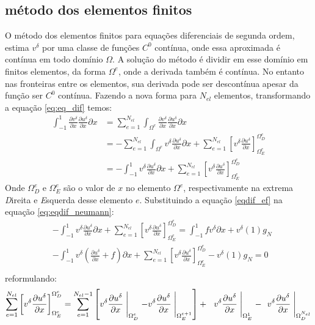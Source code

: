 \subsection{método dos elementos finitos}
 O método dos elementos finitos para equações diferenciais de segunda ordem, estima $v^\delta$ por uma classe de funções $C^0$ contínua, onde essa aproximada é contínua em todo domínio $\Omega$. A solução do método é dividir em esse domínio em finitos elementos, da forma $\Omega^e$, onde a derivada também é contínua. No entanto nas fronteiras entre os elementos, sua derivada pode ser descontínua apesar da função ser $C^0$ contínua.
 Fazendo a nova forma para $N_{el}$ elementos, transformando a equação \eqref{eq:eq_dif} temos:
\begin{align} 
 \int^1_{-1} \frac{\partial v^\delta}{\partial x}\frac{\partial u^\delta}{\partial x} \partial x&= 
\sum^{N_{el}}_{e=1} \int_{\Omega^e}\frac{\partial v^\delta}{\partial x}\frac{\partial u^\delta}{\partial x} \partial x\\
& = - \sum^{N_{el}}_{e=1} \int_{\Omega^e} v^\delta\frac{\partial u^\delta}{\partial x} \partial x +\sum^{N_{el}}_{e=1} \left [ v^\delta \frac{\partial u^\delta}{\partial x}\right ]^{\Omega^e_D}_{\Omega^e_E}\\
& = -\int^1_{-1} v^\delta\frac{\partial u^\delta}{\partial x} \partial x +\sum^{N_{el}}_{e=1} \left [ v^\delta \frac{\partial u^\delta}{\partial x}\right ]^{\Omega^e_D}_{\Omega^e_E}\label{eqdif_ef}
\end{align}
 Onde $\Omega^e_D$ e $\Omega^e_E$ são o valor de $x$ no elemento  $\Omega^e$, respectivamente na extrema \emph{D}ireita e \emph{E}squerda desse elemento $e$. Substituindo a equação \eqref{eqdif_ef} na equação \eqref{eq:eqdif_neumann}:
 \begin{align}
& -\int^1_{-1} v^\delta\frac{\partial u^\delta}{\partial x} \partial x +\sum^{N_{el}}_{e=1} \left [ v^\delta \frac{\partial u^\delta}{\partial x}\right ]^{\Omega^e_D}_{\Omega^e_E} =\int^1_{-1} fv^\delta  \partial x + v^\delta(1)g_N \\
& -\int^1_{-1} v^\delta\left (\frac{\partial u^\delta}{\partial x} + f  \right ) \partial x +\sum^{N_{el}}_{e=1} \left [ v^\delta \frac{\partial u^\delta}{\partial x}\right ]^{\Omega^e_D}_{\Omega^e_E} -  v^\delta(1)g_N = 0 \\
 \end{align}
  reformulando:
\begin{equation}
\sum^{N_{el}}_{e=1} \left [ v^\delta \frac{\partial u^\delta}{\partial x}\right ]^{\Omega^e_D}_{\Omega^e_E} = \sum^{{N_{el} -1}}_{e=1} \left [ v^\delta \frac{\partial u^\delta}{\partial x}\Biggm\lvert_{\Omega^e_D} -  v^\delta \frac{\partial u^\delta}{\partial x}\Biggm\lvert_{\Omega^{e+ 1}_E}    \right ] +\ \    v^\delta \frac{\partial u^\delta}{\partial x}\Biggm\lvert_{\Omega^{1}_E} -\ \   v^\delta \frac{\partial u^\delta}{\partial x}\Biggm\lvert_{\Omega^{N_{el}}_D}
\end{equation}
